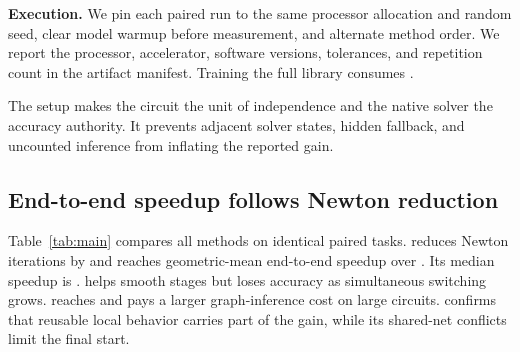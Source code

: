 \noindent\textbf{Execution.}
We pin each paired run to the same processor allocation and random seed, clear model warmup before measurement, and alternate method order. We report the processor, accelerator, software versions, tolerances, and repetition count in the artifact manifest. Training the full library consumes \TrainingHours{}.

\takeaway The setup makes the circuit the unit of independence and the native solver the accuracy authority. It prevents adjacent solver states, hidden fallback, and uncounted inference from inflating the reported gain.

\subsection{End-to-end speedup follows Newton reduction}

Table~\ref{tab:main} compares all methods on identical paired tasks. \system{} reduces Newton iterations by \NewtonReduction{} and reaches \HeadlineSpeedup{} geometric-mean end-to-end speedup over . Its median speedup is \MedianSpeedup{}.  helps smooth stages but loses accuracy as simultaneous switching grows.  reaches \MonolithicSpeedup{} and pays a larger graph-inference cost on large circuits.  confirms that reusable local behavior carries part of the gain, while its shared-net conflicts limit the final start.

\begin{table}[t]
\caption{\textbf{CellWarm cuts Newton work and total time.} All values use strict paired tasks and include fallback.}
\label{tab:main}
\centering
\scriptsize
{}
\end{table}

